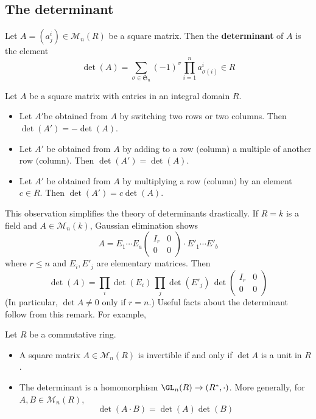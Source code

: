 \subsection{The determinant}
\begin{definition}
Let $A=(a^i_j)\in\mathcal{M}_n(R)$ be a square matrix. Then the \textbf{determinant} of $A$ is the element
\[\det(A)=\sum_{\sigma\in\mathfrak{S}_n}(-1)^{\sigma}\prod_{i=1}^{n}a^i_{\sigma(i)}\in R\]
\end{definition}
\begin{lemma}\label{Det prop}
Let $A$ be a square matrix with entries in an integral domain $R$.
\begin{itemize}
\item Let $A'$be obtained from $A$ by switching two rows or two columns. Then $\det(A')=-\det(A)$.
\item Let $A'$ be obtained from $A$ by adding to a row $($column$)$ a multiple of another row $($column$)$. Then $\det(A')=\det(A)$.
\item Let $A'$ be obtained from $A$ by multiplying a row $($column$)$ by an element $c\in R$. Then $\det(A')=c\det(A)$.
\end{itemize}
\end{lemma}
This observation simplifies the theory of determinants drastically. If $R=k$ is a field and $A\in\mathcal{M}_n(k)$, Gaussian elimination shows
\[A=E_1\cdots E_a\begin{pmatrix}
I_r&0\\
0&0
\end{pmatrix}\cdot E'_1\cdots E'_b\]
where $r\leqslant n$ and $E_i,E'_j$ are elementary matrices. Then
\[\det(A)=\prod_i\det(E_i)\,\prod_j\det(E'_j)\,\det\begin{pmatrix}
I_r&0\\
0&0
\end{pmatrix}\]
(In particular, $\det A\neq0$ only if $r=n$.) Useful facts about the determinant follow from this remark. For example,
\begin{proposition}\label{Matr inver cri}
Let $R$ be a commutative ring.
\begin{itemize}
\item A square matrix $A\in\mathcal{M}_n(R)$ is invertible if and only if $\det A$ is a unit in $R$.
\item The determinant is a homomorphism $\GL_n(R)\to (R^*,\cdot)$. More generally, for $A,B\in\mathcal{M}_n(R)$,
\[\det(A\cdot B)=\det(A)\det(B)\]
\end{itemize}
\end{proposition}
